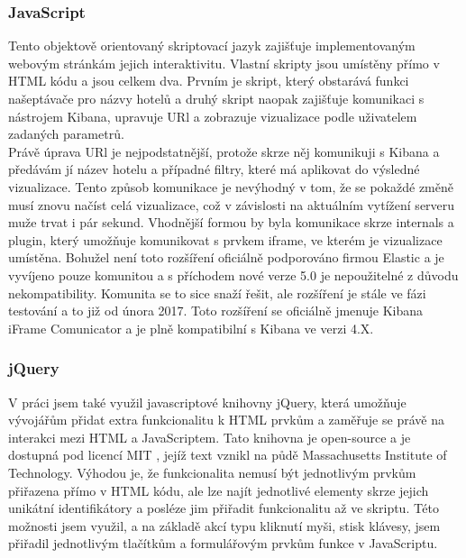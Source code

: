 \documentclass[czech,BP]{thesiskiv}
\begin{document}
\subsubsection{JavaScript}
Tento objektově orientovaný skriptovací jazyk zajišťuje implementovaným webovým stránkám jejich interaktivitu. Vlastní skripty jsou umístěny přímo v HTML kódu a jsou celkem dva. Prvním je skript, který obstarává funkci našeptávače pro názvy hotelů a druhý skript naopak zajišťuje komunikaci s nástrojem Kibana, upravuje URl a zobrazuje vizualizace podle uživatelem zadaných parametrů. 
\\
Právě úprava URl je nejpodstatnější, protože skrze něj komunikuji s Kibana a předávám jí název hotelu a případné filtry, které má aplikovat do výsledné vizualizace. Tento způsob komunikace je nevýhodný v tom, že se pokaždé změně musí znovu načíst celá vizualizace, což v závislosti na aktuálním vytížení serveru muže trvat i pár sekund. Vhodnější formou by byla komunikace skrze internals a plugin, který umožňuje komunikovat s prvkem iframe, ve kterém je vizualizace umístěna. Bohužel není toto rozšíření oficiálně podporováno firmou Elastic a je vyvíjeno pouze komunitou a s příchodem nové verze 5.0 je nepoužitelné z důvodu nekompatibility. Komunita se to sice snaží řešit, ale rozšíření je stále ve fázi testování a to již od února 2017. Toto rozšíření se oficiálně jmenuje Kibana iFrame Comunicator a je plně kompatibilní s Kibana ve verzi 4.X.
\subsubsection{jQuery}
V práci jsem také využil javascriptové knihovny jQuery, která umožňuje vývojářům přidat extra funkcionalitu k HTML prvkům a zaměřuje se právě na interakci mezi HTML a JavaScriptem. Tato knihovna je open-source a je dostupná pod licencí MIT\cite{jQuery} , jejíž text vznikl na půdě Massachusetts  Institute of Technology.\cite{MIT_licence} Výhodou je, že funkcionalita nemusí být jednotlivým prvkům přiřazena přímo v HTML kódu, ale lze najít jednotlivé elementy skrze jejich unikátní identifikátory a posléze jim přiřadit funkcionalitu až ve skriptu. Této možnosti jsem využil, a na základě akcí typu kliknutí myši, stisk klávesy, jsem přiřadil jednotlivým tlačítkům a formulářovým prvkům funkce v JavaScriptu.
\end{document}
